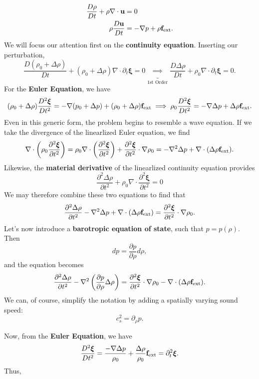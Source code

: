 \[
\begin{aligned}
    \frac{D\rho}{Dt} + \rho \nabla \cdot {\bf u} &= 0\\
    \rho \frac{D {\bf u}}{Dt} &= - \nabla p + \rho{\bf f}_{\rm ext}.
\end{aligned}
\]
We will focus our attention first on the \textbf{continuity equation}. Inserting our perturbation,
\[
\frac{D(\rho_0 + \Delta \rho)}{Dt} + (\rho_0 + \Delta \rho) \nabla \cdot \partial_t \boldsymbol{\xi} = 0 \underbrace{\implies}_{\text{1st Order}} \frac{D\Delta \rho}{Dt} + \rho_0 \nabla \cdot \partial_t \boldsymbol{\xi} = 0.
\]
For the \textbf{Euler Equation}, we have
\[
(\rho_0 + \Delta \rho) \frac{D^2 \boldsymbol{\xi}}{Dt^2} = - \nabla (p_0 +\Delta p) + (\rho_0 + \Delta \rho){\bf f}_{\rm ext} \implies \rho_0 \frac{D^2\boldsymbol{\xi}}{Dt^2} = - \nabla \Delta p + \Delta \rho {\bf f}_{\rm ext}.
\]
 Even in this generic form, the problem begins to resemble a wave equation. If we take the divergence of the linearlized Euler equation, we find
\[
\nabla \cdot \left(\rho_0 \frac{\partial^2 \boldsymbol{\xi}}{\partial t^2}\right) = \rho_0 \nabla\cdot\left(\frac{\partial ^2\boldsymbol{\xi}}{\partial t^2}\right) + \frac{\partial^2\boldsymbol{\xi}}{\partial t^2} \cdot \nabla \rho_0 = - \nabla^2 \Delta p + \nabla \cdot (\Delta \rho {\bf f}_{\rm ext}).
\]
Likewise, the \textbf{material derivative} of the linearlized continuity equation provides
\[
\frac{\partial ^2 \Delta \rho}{\partial t^2} + \rho_0 \nabla \cdot \frac{\partial ^2\boldsymbol{\xi}}{\partial t^2} = 0
\]
We may therefore combine these two equations to find that 
\[
\frac{\partial^2 \Delta \rho}{\partial t^2} - \nabla^2 \Delta p + \nabla \cdot (\Delta \rho {\bf f}_{\rm ext}) = \frac{\partial^2 \boldsymbol{\xi}}{\partial t^2} \cdot \nabla \rho_0.
\]
Let's now introduce a \textbf{barotropic equation of state}, such that $p = p(\rho)$. Then
\[
dp = \frac{\partial p}{\partial \rho} d\rho,
\]
and the equation becomes
\[
    \frac{\partial^2 \Delta \rho}{\partial t^2} - \nabla^2 \left(\frac{\partial p}{\partial \rho} \Delta \rho\right) = \frac{\partial^2 \boldsymbol{\xi}}{\partial t^2} \cdot \nabla \rho_0 -\nabla \cdot (\Delta \rho {\bf f}_{\rm ext}).
\]
We can, of course, simplify the notation by adding a spatially varying sound speed:
\[
c_s^2 = \partial_\rho p.
\]

Now, from the \textbf{Euler Equation}, we have
\[
\frac{D^2 \boldsymbol{\xi}}{Dt^2} = \frac{-\nabla \Delta p}{\rho_0}  + \frac{\Delta \rho}{\rho_0}{\bf f}_{\rm ext} = \partial^2_t \boldsymbol{\xi}.
\]
Thus, 

